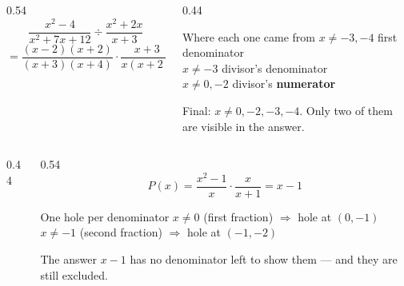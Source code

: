 \documentclass[aspectratio=169, 11pt]{beamer}
\newcommand{\lgrid}[4]{%
  \draw[step=1, linegray!45, thin] (#1,#3) grid (#2,#4);
  \draw[->, thick, charcoal] (#1,0)--(#2,0) node[below right, font=\tiny]{$x$};
  \draw[->, thick, charcoal] (0,#3)--(0,#4) node[left, font=\tiny]{$y$};}
\begin{document}
\begin{frame}[t, plain]
  \begin{columns}[T]
    \begin{column}{0.54\textwidth}
      \[ \frac{x^2-4}{x^2+7x+12}\div\frac{x^2+2x}{x+3} \]
      \[ =\frac{(x-2)(x+2)}{(x+3)(x+4)}\cdot\frac{x+3}{x(x+2)}
         =\frac{x-2}{x(x+4)} \]
    \end{column}
    \begin{column}{0.44\textwidth}
      \begin{block}{Where each one came from}
        $x\neq-3,-4$ \; first denominator \\[2pt]
        $x\neq-3$ \; divisor's denominator \\[2pt]
        $x\neq0,-2$ \; divisor's \textbf{numerator}
      \end{block}
      \vspace{3pt}
      {\footnotesize Final: $x\neq0,-2,-3,-4$. Only two of them are visible in the answer.}
    \end{column}
  \end{columns}
\end{frame}

\begin{frame}[t, plain]
  \begin{columns}[T]
    \begin{column}{0.44\textwidth}
      \centering
    \end{column}
    \begin{column}{0.54\textwidth}
      \[ P(x)=\frac{x^2-1}{x}\cdot\frac{x}{x+1}=x-1 \]
      \begin{block}{One hole per denominator}
        $x\neq0$ (first fraction) $\Rightarrow$ hole at $(0,-1)$ \\[3pt]
        $x\neq-1$ (second fraction) $\Rightarrow$ hole at $(-1,-2)$
      \end{block}
      \vspace{3pt}
      {\footnotesize The answer $x-1$ has no denominator left to show them --- and they are still
      excluded.}
    \end{column}
  \end{columns}
\end{frame}
\end{document}
